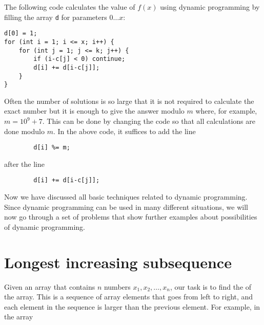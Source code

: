 The following code calculates the value of $f(x)$
using dynamic programming by filling the array
\texttt{d} for parameters $0 \ldots x$:

\begin{lstlisting}
d[0] = 1;
for (int i = 1; i <= x; i++) {
    for (int j = 1; j <= k; j++) {
        if (i-c[j] < 0) continue;
        d[i] += d[i-c[j]];
    }
}
\end{lstlisting}

Often the number of solutions is so large
that it is not required to calculate the exact number
but it is enough to give the answer modulo $m$
where, for example, $m=10^9+7$.
This can be done by changing the code so that
all calculations are done modulo $m$.
In the above code, it suffices to add the line
\begin{lstlisting}
        d[i] %= m;
\end{lstlisting}
after the line
\begin{lstlisting}
        d[i] += d[i-c[j]];
\end{lstlisting}

Now we have discussed all basic
techniques related to
dynamic programming.
Since dynamic programming can be used
in many different situations,
we will now go through a set of problems
that show further examples about
possibilities of dynamic programming.

\section{Longest increasing subsequence}


Given an array that contains $n$
numbers $x_1,x_2,\ldots,x_n$,
our task is to find the
of the array.
This is a sequence of array elements
that goes from left to right,
and each element in the sequence is larger
than the previous element.
For example, in the array

